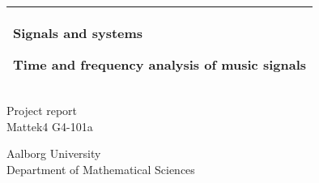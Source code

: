 %
%
%
%
%
\begin{titlepage}
  \addtolength{\hoffset}{0.5\evensidemargin-0.5\oddsidemargin} %
  \noindent%
  \begin{tabular}{@{}p{\textwidth}@{}}
    \toprule[2pt]
    \midrule
    \vspace{0.2cm}
    \begin{center}
    \Huge{\textbf{
      Signals and systems
    }}
    \end{center}
    \begin{center}
      \Large{
        Time and frequency analysis of music signals %
      }
    \end{center}
    \vspace{0.2cm}\\
    \midrule
    \toprule[2pt]
  \end{tabular}
  \begin{center}
    {\large
      Project report
    }\\
    \vspace{0.2cm}
    {\Large
      Mattek4 G4-101a
    }
  \end{center}



  \begin{center}
  Aalborg University\\
  Department of Mathematical Sciences
  \end{center}
\end{titlepage}
\clearpage
